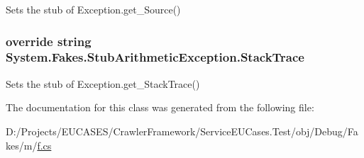 Sets the stub of Exception.\-get\-\_\-\-Source()

\hypertarget{class_system_1_1_fakes_1_1_stub_arithmetic_exception_adef3df5524e60a420c4aaf2cb655a423}{
\subsubsection[{Stack\-Trace}]{\setlength{\rightskip}{0pt plus 5cm}override string System.\-Fakes.\-Stub\-Arithmetic\-Exception.\-Stack\-Trace\hspace{0.3cm}{\ttfamily [get]}}}\label{class_system_1_1_fakes_1_1_stub_arithmetic_exception_adef3df5524e60a420c4aaf2cb655a423}


Sets the stub of Exception.\-get\-\_\-\-Stack\-Trace()



The documentation for this class was generated from the following file\-:\begin{DoxyCompactItemize}
\item 
D\-:/\-Projects/\-E\-U\-C\-A\-S\-E\-S/\-Crawler\-Framework/\-Service\-E\-U\-Cases.\-Test/obj/\-Debug/\-Fakes/m/\hyperlink{m_2f_8cs}{f.\-cs}\end{DoxyCompactItemize}

